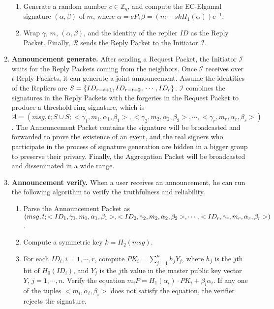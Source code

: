 \documentclass[a4paper]{article}
\begin{document}
\begin{enumerate}
\begin{enumerate}
        \item Generate a random number $c \in \mathbb{Z}_q$, and compute the EC-Elgamal signature $(\alpha, \beta)$ of $m$, where $\alpha = c P, \beta = (m - sk H_1(\alpha))c^{-1}$.
        \item Wrap $\gamma$, $m$, $(\alpha, \beta)$, and the identity of the replier $ID$ as the Reply Packet. Finally, $\mathcal{R}$ sends the Reply Packet to the Initiator $\mathcal{I}$.
        \end{enumerate}
 \item \textbf{Announcement generate.} After sending a Request Packet, the Initiator $\mathcal{I}$ waits for the Reply Packets coming from the neighbors. Once $\mathcal{I}$ receives over $t$ Reply Packets, it can generate a joint announcement. Assume the identities of the Repliers are $S = \{ID_{r-t+1}, ID_{r-t+2}, \\\cdots, ID_r\}$. $\mathcal{I}$ combines the signatures in the Reply Packets with the forgeries in the Request Packet to produce a threshold ring signature, which is $A = (msg,t; S \cup \overline{S}; <\gamma_1, m_1, \alpha_1, \beta_1>, <\gamma_2, m_2, \alpha_2, \beta_2>, \cdots, <\gamma_r, m_r, \alpha_r, \beta_r>)$. The Announcement Packet contains the signature will be broadcasted and forwarded to prove the existence of an event, and the real signers who participate in the process of signature generation are hidden in a bigger group to preserve their privacy. Finally, the Aggregation Packet will be broadcasted and disseminated in a wide range.
 \item \textbf{Announcement verify.} When a user receives an announcement, he can run the following algorithm to verify the truthfulness and reliability.
        \begin{enumerate}
        \item Parse the Announcement Packet as $(msg,t; <ID_1, \gamma_1, m_1, \alpha_1, \beta_1>, <ID_2, \gamma_2, m_2, \alpha_2,\\\beta_2>, \cdots, <ID_r, \gamma_r, m_r, \alpha_r, \beta_r>)$.
        \item Compute a symmetric key $k = H_2(msg)$.
        \item For each $ID_i, i = 1, \cdots, r$, compute $PK_i = \sum_{j=1}^n {h_j}{Y_j}$, where $h_j$ is the $j$th bit of $H_0(ID_i)$, and $Y_j$ is the $j$th value in the master public key vector $Y$, $j = 1,\cdots, n$. Verify the equation $m_i P = H_1(\alpha_i) \cdot PK_i + \beta_i \alpha_i$. If any one of the tuples $<m_i,\alpha_i,\beta_i>$ does not satisfy the equation, the verifier rejects the signature.

\end{enumerate}
\end{enumerate}
\end{document}

